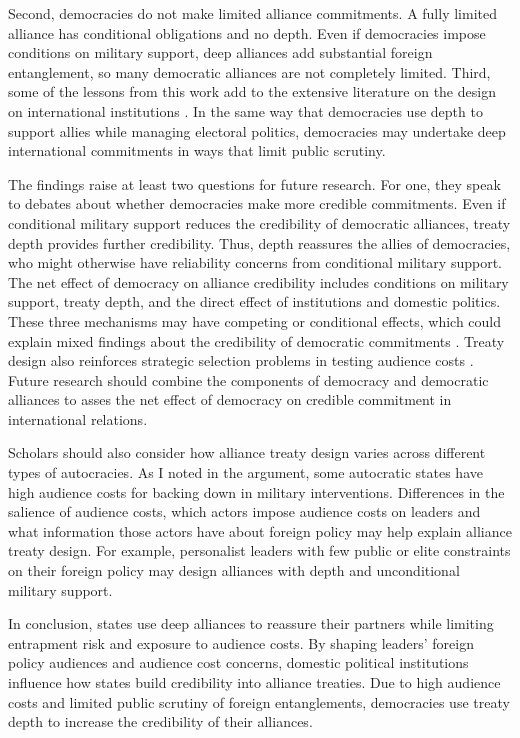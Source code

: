 \documentclass[12pt]{article}
\begin{document}
Second, democracies do not make limited alliance commitments. 
A fully limited alliance has conditional obligations and no depth.
Even if democracies impose conditions on military support, deep alliances add substantial foreign entanglement, so many democratic alliances are not completely limited.  
Third, some of the lessons from this work add to the extensive literature on the design on international institutions \citep{DownesRocke1995, MartinSimmons1998, Koremenosetal2001, Thompson2010}.
In the same way that democracies use depth to support allies while managing electoral politics, democracies may undertake deep international commitments in ways that limit public scrutiny. 


The findings raise at least two questions for future research.  
For one, they speak to debates about whether democracies make more credible commitments. 
Even if conditional military support reduces the credibility of democratic alliances, treaty depth provides further credibility. 
Thus, depth reassures the allies of democracies, who might otherwise have reliability concerns from conditional military support. 
The net effect of democracy on alliance credibility includes conditions on military support, treaty depth, and the direct effect of institutions and domestic politics. 
These three mechanisms may have competing or conditional effects, which could explain mixed findings about the credibility of democratic commitments \citep{Schultz1999, Leeds1999, Thyne2012, DownesSechser2012, PotterBaum2014}.
Treaty design also reinforces strategic selection problems in testing audience costs \citep{Schultz2001}. 
Future research should combine the components of democracy and democratic alliances to asses the net effect of democracy on credible commitment in international relations. 


Scholars should also consider how alliance treaty design varies across different types of autocracies. 
As I noted in the argument, some autocratic states have high audience costs for backing down in military interventions. 
Differences in the salience of audience costs, which actors impose audience costs on leaders and what information those actors have about foreign policy \citep{Weeks2008} may help explain alliance treaty design.
For example, personalist leaders with few public or elite constraints on their foreign policy may design alliances with depth and unconditional military support. 


In conclusion, states use deep alliances to reassure their partners while limiting entrapment risk and exposure to audience costs. 
By shaping leaders' foreign policy audiences and audience cost concerns, domestic political institutions influence how states build credibility into alliance treaties.
Due to high audience costs and limited public scrutiny of foreign entanglements, democracies use treaty depth to increase the credibility of their alliances. 



 
 
\end{document}
